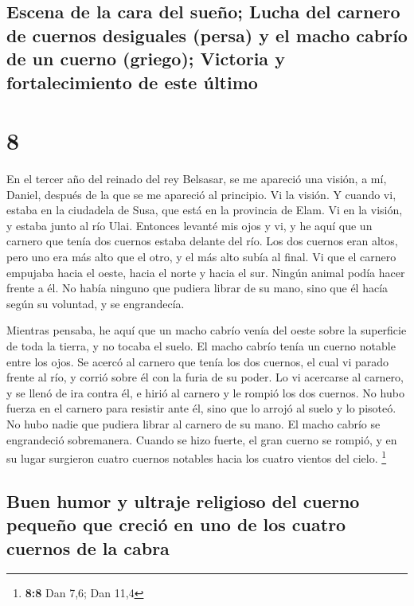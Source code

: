 \begin{paracol}{2}
{\subsection{Escena de la cara del sueño; Lucha del carnero de cuernos
desiguales (persa) y el macho cabrío de un cuerno (griego); Victoria y
fortalecimiento de este
último}\label{escena-de-la-cara-del-sueuxf1o-lucha-del-carnero-de-cuernos-desiguales-persa-y-el-macho-cabruxedo-de-un-cuerno-griego-victoria-y-fortalecimiento-de-este-uxfaltimo}}

\hypertarget{section-14}{%
\section{8}\label{section-14}}

 En el tercer año del reinado del rey Belsasar, se me
apareció una visión, a mí, Daniel, después de la que se me apareció al
principio.  Vi la visión. Y cuando vi, estaba en la
ciudadela de Susa, que está en la provincia de Elam. Vi en la visión, y
estaba junto al río Ulai.  Entonces levanté mis ojos y vi,
y he aquí que un carnero que tenía dos cuernos estaba delante del río.
Los dos cuernos eran altos, pero uno era más alto que el otro, y el más
alto subía al final.  Vi que el carnero empujaba hacia el
oeste, hacia el norte y hacia el sur. Ningún animal podía hacer frente a
él. No había ninguno que pudiera librar de su mano, sino que él hacía
según su voluntad, y se engrandecía.

 Mientras pensaba, he aquí que un macho cabrío venía del
oeste sobre la superficie de toda la tierra, y no tocaba el suelo. El
macho cabrío tenía un cuerno notable entre los ojos.  Se
acercó al carnero que tenía los dos cuernos, el cual vi parado frente al
río, y corrió sobre él con la furia de su poder.  Lo vi
acercarse al carnero, y se llenó de ira contra él, e hirió al carnero y
le rompió los dos cuernos. No hubo fuerza en el carnero para resistir
ante él, sino que lo arrojó al suelo y lo pisoteó. No hubo nadie que
pudiera librar al carnero de su mano.  El macho cabrío se
engrandeció sobremanera. Cuando se hizo fuerte, el gran cuerno se
rompió, y en su lugar surgieron cuatro cuernos notables hacia los cuatro
vientos del cielo. \footnote{\textbf{8:8} Dan 7,6; Dan 11,4}

\hypertarget{buen-humor-y-ultraje-religioso-del-cuerno-pequeuxf1o-que-creciuxf3-en-uno-de-los-cuatro-cuernos-de-la-cabra}{%
\subsection{Buen humor y ultraje religioso del cuerno pequeño que creció
en uno de los cuatro cuernos de la
cabra}\label{buen-humor-y-ultraje-religioso-del-cuerno-pequeuxf1o-que-creciuxf3-en-uno-de-los-cuatro-cuernos-de-la-cabra}}


\end{paracol}
